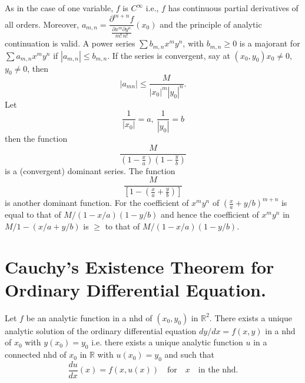 As in the case of one variable, $f$ is $C^{\infty}$ i.e., $f$ has continuous partial derivatives of all orders. Moreover, $a_{m,n}=\dfrac{\partial^{m+n}f}{\frac{\partial x^{m}\partial y^{n}}{m!\,n!}}(x_{0})$ and the principle of analytic continuation is valid. A power series $\sum b_{m,n}x^{m}y^{n}$, with $b_{m,n}\geq 0$ is a majorant for $\sum a_{m,n}x^{m}y^{n}$ if $|a_{m,n}|\leq b_{m,n}$. If the series is convergent, say at $(x_{0},y_{0}) x_{0}\neq 0$, $y_{0}\neq 0$, then
$$
|a_{mn}|\leq \frac{M}{|x_{0}|^{m}|y_{0}|^{n}}.
$$
Let
$$
\frac{1}{|x_{0}|}=a, \ \frac{1}{|y_{0}|}=b
$$
then the function
$$
\frac{M}{\left(1-\frac{x}{a}\right)\left(1-\frac{y}{b}\right)}
$$
is a (convergent) dominant series. The function
$$
\frac{M}{\left[1-\left(\frac{x}{a}+\frac{y}{b}\right)\right]}
$$
is another dominant function. For the coefficient of $x^{m}y^{n}$ of $\left(\frac{x}{a}+y/b\right)^{m+n}$ is equal to that of $M/(1-x/a)(1-y/b)$ and hence the coefficient of $x^{m}y^{n}$ in $M/1-(x/a+y/b)$ is $\geq$ to that of $M/(1-x/a)(1-y/b)$.

\section*{Cauchy's Existence Theorem for Ordinary Differential Equation.}\pageoriginale

\begin{theorem*}
Let $f$ be an analytic function in a nhd of $(x_{0},y_{0})$ in $\mathbb{R}^{2}$. There exists a unique analytic solution of the ordinary differential equation $dy/dx=f(x,y)$ in a nhd of $x_{0}$ with $y(x_{0})=y_{0}$ i.e. there exists a unique analytic function $u$ in a connected nhd of $x_{0}$ in $\mathbb{R}$ with $u(x_{0})=y_{0}$ and such that
$$
\frac{du}{dx}(x)=f(x,u(x))\quad\text{for}\quad x\quad \text{in the nhd.}
$$
\end{theorem*}

